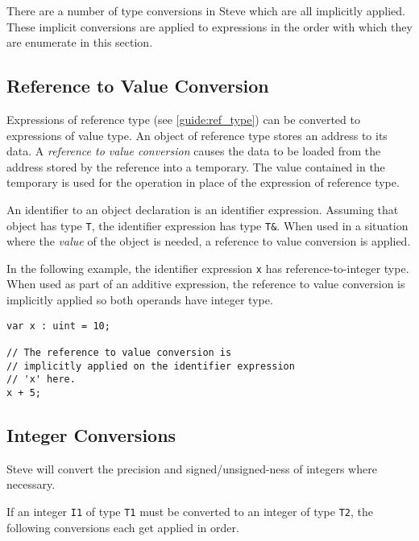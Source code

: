 There are a number of type conversions in Steve which are all implicitly applied. These implicit conversions are applied to expressions in the order with which they are enumerate in this section.

\subsection{Reference to Value Conversion} \label{guide:reftoval_conv}

Expressions of reference type (see \ref{guide:ref_type}) can be converted to expressions of value type. An object of reference type stores an address to its data. A \textit{reference to value conversion} causes the data to be loaded from the address stored by the reference into a temporary. The value contained in the temporary is used for the operation in place of the expression of reference type.

An identifier to an object declaration is an identifier expression. Assuming that object has type \texttt{T}, the identifier expression has type \texttt{T\&}. When used in a situation where the \textit{value} of the object is needed, a reference to value conversion is applied.

In the following example, the identifier expression \texttt{x} has reference-to-integer type. When used as part of an additive expression, the reference to value conversion is implicitly applied so both operands have integer type.

\begin{minip}
\begin{lstlisting}
var x : uint = 10;

// The reference to value conversion is
// implicitly applied on the identifier expression
// 'x' here.
x + 5;
\end{lstlisting}
\end{minip}

\subsection{Integer Conversions} \label{guide:int_conv}

Steve will convert the precision and signed/unsigned-ness of integers where necessary.

If an integer \texttt{I1} of type \texttt{T1} must be converted to an integer of type \texttt{T2}, the following conversions each get applied in order.

